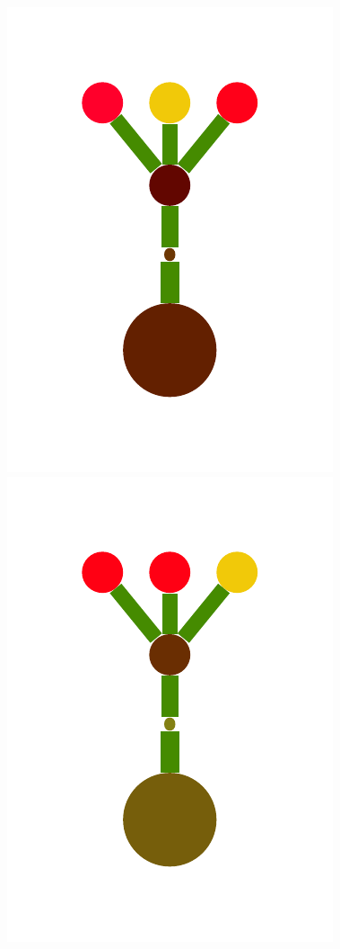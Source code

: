 \documentclass[a4paper,10pt]{article}
\begin{document}
\begin{figure}[t]
  \includegraphics[scale=.26]{./figures/2-2-initProgram-4.pdf}
  \includegraphics[scale=.26]{./figures/2-2-initProgram-5.pdf}

\end{figure}
\end{document}
